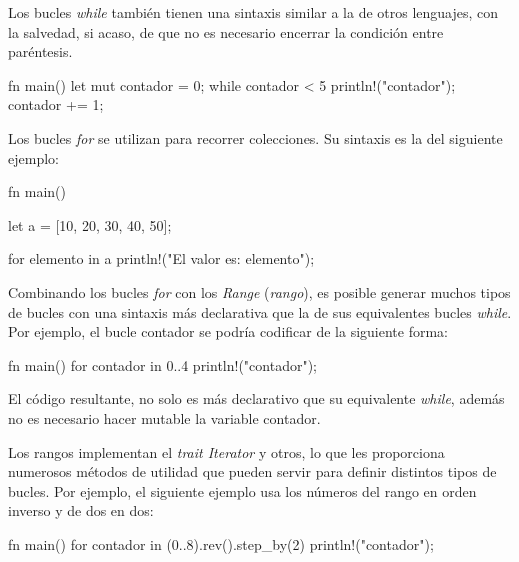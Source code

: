 Los bucles \textit{while} también tienen una sintaxis similar a la de otros lenguajes, con la salvedad, si acaso, de que no es necesario encerrar la condición entre paréntesis.

\vspace{0.7em}
\begin{Codigo}
fn main() {
   let mut contador = 0;
   while contador < 5 {
      println!("{contador}");
      contador += 1;
   }
}
\end{Codigo}

\vspace{2em}

Los bucles \textit{for} se utilizan para recorrer colecciones. Su sintaxis es la del siguiente ejemplo:

\vspace{0.7em}
\begin{Codigo}
fn main() {
   let a = [10, 20, 30, 40, 50];
   
   for elemento in a {
      println!("El valor es: {elemento}");
   }
}
\end{Codigo}

Combinando los bucles \textit{for} con los \textit{Range} (\textit{rango}), es posible generar muchos tipos de bucles con una sintaxis más declarativa que la de sus equivalentes bucles \textit{while}. Por ejemplo, el bucle contador se podría codificar de la siguiente forma:

\vspace{0.7em}
\begin{Codigo}
fn main() {
   for contador in 0..4 {
      println!("{contador}");
   }
}
\end{Codigo}

El código resultante, no solo es más declarativo que su equivalente \textit{while}, además no es necesario hacer mutable la variable contador.

Los rangos implementan el \textit{trait Iterator} y otros, lo que les proporciona numerosos métodos de utilidad que pueden servir para definir distintos tipos de bucles. Por ejemplo, el siguiente ejemplo usa los números del rango en orden inverso y de dos en dos:

\vspace{0.7em}
\begin{Codigo}
fn main() {
   for contador in (0..8).rev().step_by(2) {
      println!("{contador}");
   }
}
\end{Codigo}

\vspace{1em}

